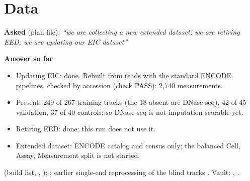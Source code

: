 \documentclass[10pt,letterpaper]{article}
\newcommand{\cl}[1]{#1}
\newcommand{\asked}[1]{\textbf{Asked} (plan file): \emph{``#1''}\par}
\newcommand{\hd}[1]{\textbf{#1}\par}
\begin{document}
\section{Data}
\asked{we are collecting a new extended dataset; we are retiring EED; we are updating our EIC dataset}
\cl{\hd{Answer so far}
\begin{itemize}
\item Updating EIC: done. Rebuilt from reads with the standard ENCODE pipelines, checked by accession (check PASS): 2,740 measurements.
\item Present: 249 of 267 training tracks (the 18 absent are DNase-seq), 42 of 45 validation, 37 of 40 controls; so DNase-seq is not imputation-scorable yet.
\item Retiring EED: done; this run does not use it.
\item Extended dataset: ENCODE catalog and census only; the balanced Cell, Assay, Measurement split is not started.
\end{itemize}}
\begin{where}
 (build list, %
, ); ; earlier single-end reprocessing of the blind tracks .
Vault: , .
\end{where}

\end{document}
